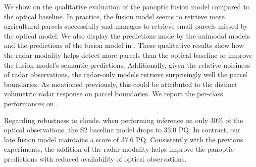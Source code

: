 We show on  the qualitative evaluation of the panoptic fusion model compared to the optical baseline. In practice, the fusion model seems to retrieve more agricultural parcels successfully and manages to retrieve small parcels missed by the optical model. We also display the predictions made by the unimodal models and the predictions of the fusion model in . These qualitative results show how the radar modality helps detect more parcels than the optical baseline or improve the fusion model's semantic predictions. Additionally, given the relative noisiness of radar observations, the radar-only models retrieve surprisingly well the parcel boundaries. {As mentioned previously, this could be attributed to the distinct volumetric radar response on parcel boundaries.}  We report the per-class performances on . 

Regarding robustness to clouds, when performing inference on only $30$\% of the optical observations, the S2 baseline model drops to $33.0$ PQ. In contrast, our late fusion model maintains a score of $37.6$ PQ. Consistently with the previous experiments, the addition of the radar modality helps improve the panoptic predictions with reduced availability of optical observations.








